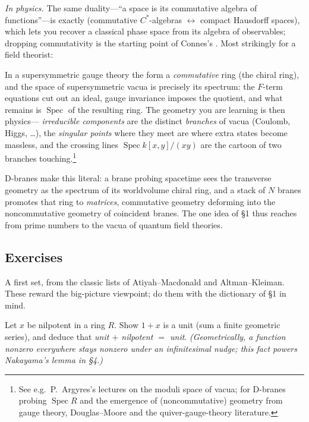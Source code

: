 \documentclass[11pt]{article}
\DeclareMathOperator{\Spec}{Spec}
\begin{document}
\emph{In physics.} The same duality---``a space is its commutative algebra of functions''---is
exactly  (commutative $C^\ast$-algebras $\leftrightarrow$ compact
Hausdorff spaces), which lets you recover a classical phase space from its algebra of
observables; dropping commutativity is the starting point of Connes's . Most strikingly for a field theorist:

\begin{iidea}[$\Spec$ of the chiral ring $=$ the moduli space of vacua]
In a supersymmetric gauge theory the  form a \emph{commutative} ring
(the chiral ring), and the space of supersymmetric vacua is precisely its spectrum: the
$F$-term equations cut out an ideal, gauge invariance imposes the quotient, and what remains is
$\Spec$ of the resulting ring. The geometry you are learning is then physics---
\emph{irreducible components} are the distinct \emph{branches} of vacua (Coulomb, Higgs,
\dots), the \emph{singular points} where they meet are where extra states become massless, and
the crossing lines $\Spec k[x,y]/(xy)$ are the cartoon of two branches touching.\footnote{See
e.g.\ P.~Argyres's lectures on the moduli space of vacua; for D-branes probing $\Spec R$ and
the emergence of (noncommutative) geometry from gauge theory, Douglas--Moore and the
quiver-gauge-theory literature.}
\end{iidea}

\noindent
D-branes make this literal: a brane probing spacetime sees the transverse geometry as the
spectrum of its worldvolume chiral ring, and a stack of $N$ branes promotes that ring to
\emph{matrices}, commutative geometry deforming into the noncommutative geometry of coincident
branes. The one idea of \S1 thus reaches from prime numbers to the vacua of quantum field
theories.

\subsection{Exercises}

\noindent
A first set, from the classic lists of Atiyah--Macdonald and Altman--Kleiman. These reward the
big-picture viewpoint; do them with the dictionary of \S1 in mind.

\begin{xca}
Let $x$ be nilpotent in a ring $R$. Show $1+x$ is a unit (sum a finite geometric series), and
deduce that \emph{unit $+$ nilpotent $=$ unit}. \emph{(Geometrically, a function nonzero
everywhere stays nonzero under an infinitesimal nudge; this fact powers Nakayama's lemma in
\S4.)}
\end{xca}
\end{document}
